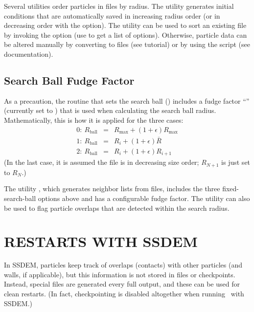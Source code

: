 Several utilities order particles in  files by radius.  The
 utility generates initial conditions that are
automatically saved in increasing radius order (or in decreasing order
with the  option).  The  utility can be used to
sort an existing  file by invoking the  option (use
 to get a list of options).  Otherwise, particle data can
be altered manually by converting to  files (see tutorial) or
by using the  script (see documentation).

\subsection{Search Ball Fudge Factor}

As a precaution, the routine that sets the search ball
() includes a fudge factor
``'' (currently set to ) that is used when
calculating the search ball radius. Mathematically, this is how it is
applied for the three cases:
\begin{eqnarray*}
  0:\ R_{\mathrm{ball}} & = & R_{\mathrm{max}} + (1 + \epsilon) R_{\mathrm{max}} \\
  1:\ R_{\mathrm{ball}} & = & R_i + (1 + \epsilon) \bar{R} \\
  2:\ R_{\mathrm{ball}} & = & R_i + (1 + \epsilon) R_{i+1}
\end{eqnarray*}
(In the last case, it is assumed the file is in decreasing size order;
$R_{N+1}$ is just set to $R_N$.)

The utility , which generates neighbor lists from 
files, includes the three fixed-search-ball options above and has a
configurable fudge factor.  The utility can also be used to flag
particle overlaps that are detected within the search radius.

\section{RESTARTS WITH SSDEM} \label{s:restarts}

In SSDEM, particles keep track of overlaps (contacts) with other
particles (and walls, if applicable), but this information is not
stored in  files or checkpoints.  Instead, special
 files are generated every full  output, and these
can be used for clean restarts.  (In fact, checkpointing is disabled
altogether when running \pkd\ with SSDEM.)

